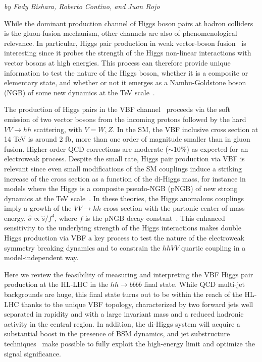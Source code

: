 \begin{center}
\textit{by Fady Bishara, Roberto Contino, and Juan Rojo}
\end{center}

While the dominant production channel of Higgs boson pairs at hadron colliders is the gluon-fusion mechanism, other channels are also of phenomenological relevance. In particular, Higgs pair production in weak vector-boson fusion~\cite{Bishara:2016kjn} is interesting since it probes the
strength of the  Higgs non-linear interactions with vector bosons at high
energies. This process can therefore provide unique information
to test the nature of the Higgs boson,
whether it is a composite or elementary state, and whether or not it emerges as
a Nambu-Goldstone boson (NGB) of some new dynamics at the TeV
scale~\cite{Giudice:2007fh,Contino:2010mh,Contino:2013gna}.

The production of Higgs pairs in the  VBF
channel~\cite{Giudice:2007fh,Contino:2010mh,Dolan:2013rja,Brooijmans:2014eja,Liu-Sheng:2014gxa,Dolan:2015zja} proceeds via the soft emission of two vector bosons from the incoming protons  followed by 
the hard $VV \to hh$ scattering, with $V=W,Z$.
%
In the SM, the VBF inclusive cross section
at 14 TeV is around 2 fb, more than one
order of magnitude smaller than in gluon fusion.
Higher order QCD corrections are moderate ($\sim 10\%$) as
expected for an electroweak process.
%
Despite the small rate, Higgs pair production via VBF is relevant since
even small modifications of the SM couplings induce a striking increase of the
cross section as a function of the di-Higgs mass, for instance in models 
where the Higgs is a composite pseudo-NGB (pNGB) of new strong dynamics at the TeV scale~\cite{Kaplan:1983fs}.
%
In these theories, the Higgs anomalous couplings imply a growth of the $VV\to hh$ cross section with the
partonic center-of-mass energy, $\hat{\sigma} \propto \hat s/f^4$, where $f$ is the pNGB decay constant~\cite{Giudice:2007fh}.
%
This enhanced sensitivity to the underlying strength of the Higgs interactions makes 
double Higgs production via VBF a key process to test the nature of the
electroweak symmetry breaking dynamics
and to constrain the $hhVV$ quartic coupling in a model-independent way.

Here we review the feasibility of measuring and interpreting
the VBF Higgs pair production at the HL-LHC in
 the $hh\to b\bar{b}b\bar{b}$ final state.
 While QCD multi-jet backgrounds are huge, this final state turns out
 to be within the reach of the HL-LHC thanks to the unique VBF topology,
characterized by two forward jets well separated in rapidity and with a large
invariant mass and a reduced hadronic activity in the central region. 
In addition, the di-Higgs system will acquire a substantial boost
in the presence of BSM dynamics, and jet
substructure techniques~\cite{Salam:2009jx,Gouzevitch:2013qca,Behr:2015oqq} 
make possible to fully exploit the
high-energy limit and optimize the signal significance.

